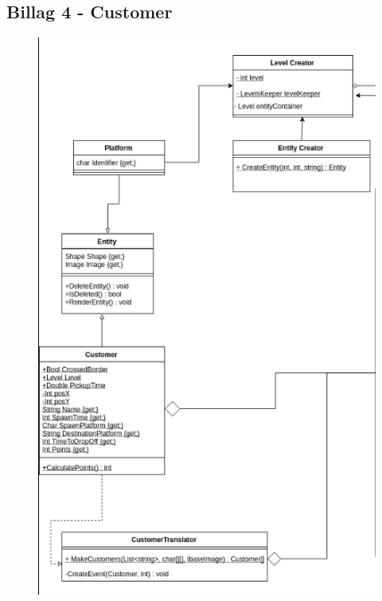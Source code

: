 \subsection{Billag 4 - Customer}
\begin{figure}[H]
  \includegraphics[width=(\linewidth-1cm)]{Customer.png}
\end{figure}
